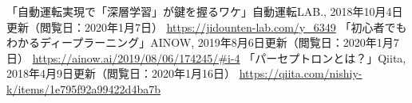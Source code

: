 \begin{thebibliography}{99}
     「自動運転実現で「深層学習」が鍵を握るワケ」自動運転LAB., 2018年10月4日更新（閲覧日：2020年1月7日） \url{https://jidounten-lab.com/y_6349}
     「初心者でもわかるディープラーニング」AINOW, 2019年8月6日更新（閲覧日：2020年1月7日） \url{https://ainow.ai/2019/08/06/174245/#i-4}
     「パーセプトロンとは？」Qiita, 2018年4月9日更新（閲覧日：2020年1月16日） \url{https://qiita.com/nishiy-k/items/1e795f92a99422d4ba7b}
\end{thebibliography}